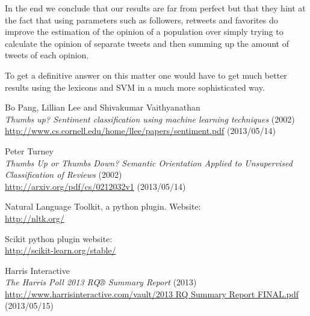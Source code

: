 \documentclass[a4paper,12pt]{report}
\begin{document}
In the end we conclude that our results are far from perfect but that they hint at the fact that using parameters such as followers, retweets and favorites do improve the estimation of the opinion of a population over simply trying to calculate the opinion of separate tweets and then summing up the amount of tweets of each opinion.

To get a definitive answer on this matter one would have to get much better results using the lexicons and SVM in a much more sophisticated way.

\begin{thebibliography}{9}

  
  Bo Pang, Lillian Lee and Shivakumar Vaithyanathan\\
  \emph{Thumbs up? Sentiment classification using machine learning techniques} (2002)\\
  \url{http://www.cs.cornell.edu/home/llee/papers/sentiment.pdf} (2013/05/14)

  Peter Turney\\
  \emph{Thumbs Up or Thumbs Down? Semantic Orientation Applied to Unsupervised Classification of Reviews} (2002)\\
  \url{http://arxiv.org/pdf/cs/0212032v1} (2013/05/14)
  
  Natural Language Toolkit, a python plugin. Website:\\
  \url{http://nltk.org/}
  
  Scikit python plugin website:\\
  \url{http://scikit-learn.org/stable/}

  Harris Interactive\\
  \emph{The Harris Poll 2013 RQ® Summary Report} (2013)\\
  \url{http://www.harrisinteractive.com/vault/2013 RQ Summary Report FINAL.pdf} (2013/05/15)

\end{thebibliography}
\end{document}
